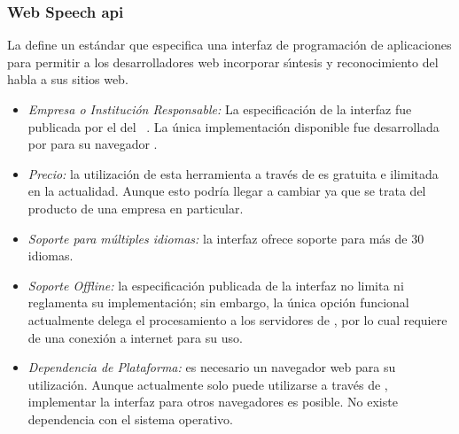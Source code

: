 \subsubsection{Web Speech \gls{api}}
\label{sec:webspeech}

La  define un est\'andar que especifica una interfaz de programaci\'on de aplicaciones para permitir
a los desarrolladores web incorporar s{\'\i}ntesis y reconocimiento del habla a sus sitios web.

\begin{itemize}
	\item \emph{Empresa o Instituci\'on Responsable:} La especificaci\'on de la interfaz fue
	publicada por el  del
	\mbox{ \cite{GoogleWebSpeechAPI}.}
	La \'unica implementaci\'on disponible fue desarrollada por  para su navegador .
	\item \emph{Precio:} la utilizaci\'on de esta herramienta a trav\'es de  es gratuita e
	ilimitada en la actualidad. Aunque esto podr\'ia llegar a cambiar ya que se trata del producto de una empresa
    en particular.
	\item \emph{Soporte para m\'ultiples idiomas:} la interfaz ofrece soporte para m\'as de 30 idiomas.
	\item \emph{Soporte Offline:} la especificaci\'on publicada de la interfaz no limita ni reglamenta su
	implementaci\'on; sin embargo, la \'unica opci\'on funcional actualmente delega el procesamiento a los
	servidores de , por lo cual requiere de una conexi\'on a internet para su uso.
	\item \emph{Dependencia de Plataforma:} es necesario un navegador web para su utilización.
	Aunque actualmente solo puede utilizarse a trav\'es de , implementar la interfaz
	para otros navegadores es posible. No existe dependencia con el sistema operativo.
\end{itemize}

